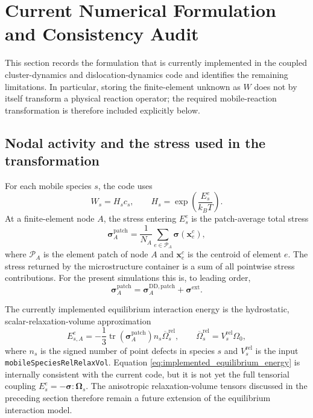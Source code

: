 \documentclass[10pt]{article}
\begin{document}
\section{Current Numerical Formulation and Consistency Audit}

This section records the formulation that is currently implemented in the
coupled cluster-dynamics and dislocation-dynamics code and identifies the
remaining limitations.  In particular, storing the finite-element unknown as
$W$ does not by itself transform a physical reaction operator; the required
mobile-reaction transformation is therefore included explicitly below.

\subsection{Nodal activity and the stress used in the transformation}

For each mobile species $s$, the code uses
\begin{equation}
    W_s = H_s c_s,
    \qquad
    H_s = \exp\left(\frac{E_s^e}{k_BT}\right).
    \label{eq:implemented_W_definition}
\end{equation}
At a finite-element node $A$, the stress entering $E_s^e$ is the patch-average
total stress
\begin{equation}
    \boldsymbol{\sigma}^{\mathrm{patch}}_A
    =
    \frac{1}{N_A}
    \sum_{e\in\mathcal{P}_A}
    \boldsymbol{\sigma}\left(\boldsymbol{x}_e^{c}\right),
    \label{eq:patch_average_stress}
\end{equation}
where $\mathcal{P}_A$ is the element patch of node $A$ and
$\boldsymbol{x}_e^{c}$ is the centroid of element $e$.  The stress returned by
the microstructure container is a sum of all pointwise stress contributions.
For the present simulations this is, to leading order,
\begin{equation}
    \boldsymbol{\sigma}^{\mathrm{patch}}_A
    =
    \boldsymbol{\sigma}^{\mathrm{DD,patch}}_A
    +
    \boldsymbol{\sigma}^{\mathrm{ext}}.
\end{equation}

The currently implemented equilibrium interaction energy is the hydrostatic,
scalar-relaxation-volume approximation
\begin{equation}
    E_{s,A}^e
    =
    -\frac{1}{3}
    \operatorname{tr}
    \left(\boldsymbol{\sigma}^{\mathrm{patch}}_A\right)
    n_s \overline{\Omega}^{\mathrm{rel}}_s,
    \qquad
    \overline{\Omega}^{\mathrm{rel}}_s
    =
    V^{\mathrm{rel}}_s\Omega_0,
    \label{eq:implemented_equilibrium_energy}
\end{equation}
where $n_s$ is the signed number of point defects in species $s$ and
$V^{\mathrm{rel}}_s$ is the input
\texttt{mobileSpeciesRelRelaxVol}.  Equation
\eqref{eq:implemented_equilibrium_energy} is internally consistent with the
current code, but it is not yet the full tensorial coupling
$E_s^e=-\boldsymbol{\sigma}:\boldsymbol{\Omega}_s$.  The anisotropic
relaxation-volume tensors discussed in the preceding section therefore remain
a future extension of the equilibrium interaction model.
\end{document}
